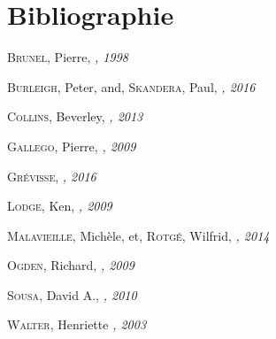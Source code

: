 \chapter{Bibliographie}

\begin{thebibliography}{99}
  \textsc{Brunel}, Pierre,
  \textit{\FL, 1998}

  \textsc{Burleigh}, Peter, and, \textsc{Skandera}, Paul,
  \textit{\bs, 2016}

  \textsc{Collins}, Beverley,
  \textit{\cpp, 2013}
  
  \textsc{Gallego}, Pierre,
  \textit{\ad, 2009}
  
  \textsc{Grévisse}, 
  \textit{\GE, 2016}
  
  \textsc{Lodge}, Ken,
  \textit{\lodge, 2009}
  
  \textsc{Malavieille}, Michèle, et, \textsc{Rotgé}, Wilfrid,
  \textit{\besch, 2014}
  
  \textsc{Ogden}, Richard,
  \textit{\ogden, 2009}

  \textsc{Sousa}, David A.,
  \textit{\HTEBL, 2010}
  
  
  \textsc{Walter}, Henriette 
  \textit{\HSQMYP, 2003}
  
\end{thebibliography}

